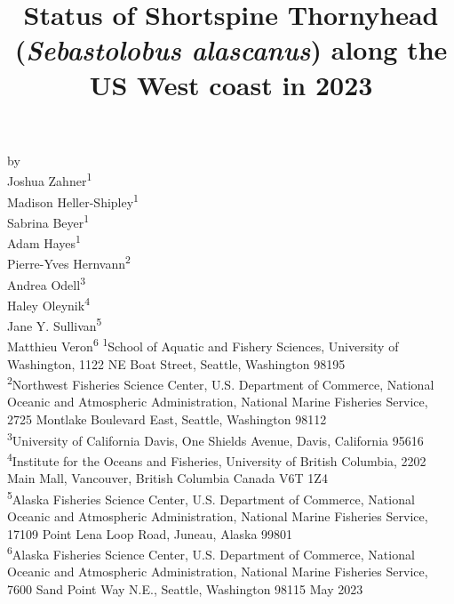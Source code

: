 \documentclass[11pt,
  english,
  letterpaper,
]{article}
\date{}
\newcommand{\trTitle}{Status of Shortspine Thornyhead (\emph{Sebastolobus alascanus}) along the US West coast in 2023}
\newcommand{\trYear}{2023}
\newcommand{\trMonth}{May}
\newcommand\includegraphicsifexists[2][width=\linewidth]{\IfFileExists{#2}{\texttt{[image: \#2]}}{}}
\begin{document}

\renewcommand*{\thefootnote}{\fnsymbol{footnote}}

\small
\thispagestyle{empty}
\noindent
\begin{center}
\title{Status of Shortspine Thornyhead (\emph{Sebastolobus alascanus}) along the US West coast in 2023}
\vspace{1.5cm}
{\Large\textbf{}}

\includegraphicsifexists[width=4in]{figure_title.png}
\vfill
by\\
Joshua Zahner\textsuperscript{1}\\
Madison Heller-Shipley\textsuperscript{1}\\
Sabrina Beyer\textsuperscript{1}\\
Adam Hayes\textsuperscript{1}\\
Pierre-Yves Hernvann\textsuperscript{2}\\
Andrea Odell\textsuperscript{3}\\
Haley Oleynik\textsuperscript{4}\\
Jane Y. Sullivan\textsuperscript{5}\\
Matthieu Veron\textsuperscript{6}\vfill
\textsuperscript{1}School of Aquatic and Fishery Sciences, University of Washington, 1122 NE Boat Street, Seattle, Washington 98195\\
\textsuperscript{2}Northwest Fisheries Science Center, U.S. Department of Commerce, National Oceanic and Atmospheric Administration, National Marine Fisheries Service, 2725 Montlake Boulevard East, Seattle, Washington 98112\\
\textsuperscript{3}University of California Davis, One Shields Avenue, Davis, California 95616\\
\textsuperscript{4}Institute for the Oceans and Fisheries, University of British Columbia, 2202 Main Mall, Vancouver, British Columbia Canada V6T 1Z4\\
\textsuperscript{5}Alaska Fisheries Science Center, U.S. Department of Commerce, National Oceanic and Atmospheric Administration, National Marine Fisheries Service, 17109 Point Lena Loop Road, Juneau, Alaska 99801\\
\textsuperscript{6}Alaska Fisheries Science Center, U.S. Department of Commerce, National Oceanic and Atmospheric Administration, National Marine Fisheries Service, 7600 Sand Point Way N.E., Seattle, Washington 98115\vfill
\trMonth{} \trYear{}
\end{center}
\clearpage
\end{document}

